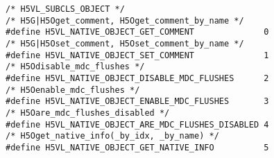 \begin{appendices}
\begin{lstlisting}
/* H5VL_SUBCLS_OBJECT */
/* H5G|H5Oget_comment, H5Oget_comment_by_name */
#define H5VL_NATIVE_OBJECT_GET_COMMENT              0 
/* H5G|H5Oset_comment, H5Oset_comment_by_name */
#define H5VL_NATIVE_OBJECT_SET_COMMENT              1 
/* H5Odisable_mdc_flushes */
#define H5VL_NATIVE_OBJECT_DISABLE_MDC_FLUSHES      2 
/* H5Oenable_mdc_flushes */
#define H5VL_NATIVE_OBJECT_ENABLE_MDC_FLUSHES       3 
/* H5Oare_mdc_flushes_disabled */
#define H5VL_NATIVE_OBJECT_ARE_MDC_FLUSHES_DISABLED 4 
/* H5Oget_native_info(_by_idx, _by_name) */
#define H5VL_NATIVE_OBJECT_GET_NATIVE_INFO          5 
\end{lstlisting}

\end{appendices}

